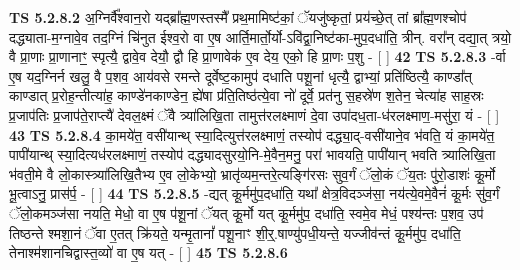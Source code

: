 \documentclass[17pt]{extarticle}
\begin{document}
                  \newline
                                \textbf{ TS 5.2.8.2} \newline
                  अ॒ग्निर्वै᳚श्वान॒रो यद्ब्रा᳚ह्म॒णस्तस्मै᳚ प्रथ॒मामिष्ट॑कां॒ ॅयजु॑ष्कृतां॒ प्रय॑च्छे॒त् तां ब्रा᳚ह्म॒णश्चोप॑ दद्ध्याता-म॒ग्नावे॒व तद॒ग्निं चि॑नुत ईश्व॒रो वा ए॒ष आर्ति॒मार्तो॒र्यो-ऽवि॑द्वा॒निष्ट॑का-मुप॒दधा॑ति॒ त्रीन्. वरा᳚न् दद्या॒त् त्रयो॒ वै प्रा॒णाः प्रा॒णानाꣳ॒॒ स्पृत्यै॒ द्वावे॒व देयौ॒ द्वौ हि प्रा॒णावेक॑ ए॒व देय॒ एको॒ हि प्रा॒णः प॒शु - [  ] \textbf{  42} \newline
                  \newline
                                \textbf{ TS 5.2.8.3} \newline
                  -र्वा ए॒ष यद॒ग्निर्न खलु॒ वै प॒शव॒ आय॑वसे रमन्ते दूर्वेष्ट॒कामुप॑ दधाति पशू॒नां धृत्यै॒ द्वाभ्यां॒ प्रति॑ष्ठित्यै॒ काण्डा᳚त् काण्डात् प्र॒रोह॒न्तीत्या॑ह॒ काण्डे॑नकाण्डेन॒ ह्ये॑षा प्र॑ति॒तिष्ठ॑त्ये॒वा नो॑ दूर्वे॒ प्रत॑नु स॒हस्रे॑ण श॒तेन॒ चेत्या॑ह साह॒स्रः प्र॒जाप॑तिः प्र॒जाप॑ते॒राप्त्यै॑ देवल॒क्ष्मं ॅवै त्र्या॑लिखि॒ता तामुत्त॑रलक्ष्माणं दे॒वा उपा॑दध॒ता-ध॑रलक्ष्माण॒-मसु॑रा॒ यं - [  ] \textbf{  43} \newline
                  \newline
                                \textbf{ TS 5.2.8.4} \newline
                  का॒मये॑त॒ वसी॑यान्थ् स्या॒दित्युत्त॑रलक्ष्माणं॒ तस्योप॑ दद्ध्या॒द्-वसी॑याने॒व भ॑वति॒ यं का॒मये॑त॒ पापी॑यान्थ् स्या॒दित्यध॑रलक्ष्माणं॒ तस्योप॑ दद्ध्यादसुरयो॒नि-मे॒वैन॒मनु॒ परा॑ भावयति॒ पापी॑यान् भवति त्र्यालिखि॒ता भ॑वती॒मे वै लो॒कास्त्र्या॑लिखि॒तैभ्य ए॒व लो॒केभ्यो॒ भ्रातृ॑व्यम॒न्तरे॒त्यङ्गि॑रसः सुव॒र्गं ॅलो॒कं ॅय॒तः पु॑रो॒डाशः॑ कू॒र्मो भू॒त्वाऽनु॒ प्रास॑र्प॒ - [  ] \textbf{  44} \newline
                  \newline
                                \textbf{ TS 5.2.8.5} \newline
                  -द्यत् कू॒र्ममु॑प॒दधा॑ति॒ यथा᳚ क्षेत्र॒विदञ्ज॑सा॒ नय॑त्ये॒वमे॒वैनं॑ कू॒र्मः सु॑व॒र्गं ॅलो॒कमञ्ज॑सा नयति॒ मेधो॒ वा ए॒ष प॑शू॒नां ॅयत् कू॒र्मो यत् कू॒र्ममु॑प॒ दधा॑ति॒ स्वमे॒व मेधं॒ पश्य॑न्तः प॒शव॒ उप॑ तिष्ठन्ते श्मशा॒नं ॅवा ए॒तत् क्रि॑यते॒ यन्मृ॒तानां᳚ पशू॒नाꣳ शी॒र्॒.षाण्यु॑पधी॒यन्ते॒ यज्जीव॑न्तं कू॒र्ममु॑प॒ दधा॑ति॒ तेनाश्म॑शानचिद्वास्त॒व्यो॑ वा ए॒ष यत् - [  ] \textbf{  45} \newline
                  \newline
                                \textbf{ TS 5.2.8.6} \newline
\end{document}
